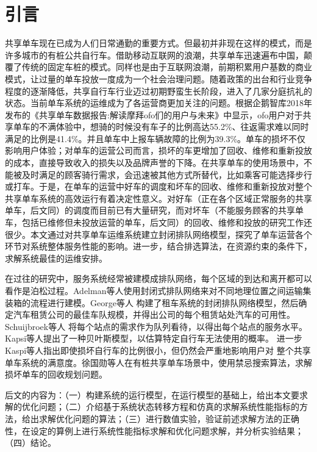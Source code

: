 \documentclass{article}
\begin{document}
\newpage

\section{引言}
共享单车现在已成为人们日常通勤的重要方式。但最初并非现在这样的模式，而是许多城市的有桩公共自行车。借助移动互联网的浪潮，共享单车迅速遍布中国，颠覆了传统的固定车桩的模式。同样也是由于互联网浪潮，前期积累用户基数的商业模式，让过量的单车投放一度成为一个社会治理问题。随着政策的出台和行业竞争程度的逐渐降低，共享自行车行业迈过初期野蛮生长阶段，进入了几家分庭抗礼的状态。当前单车系统的运维成为了各运营商更加关注的问题。根据企鹅智库2018年发布的《共享单车数据报告:解读摩拜ofo们的用户与未来》中显示，ofo用户对于共享单车的不满体验中，想骑的时候没有车子的比例高达55.2\%、往返需求难以同时满足的比例是41.4\%。并且单车中上报车辆故障的比例为39.3\%。单车的损坏不仅影响用户体验；对单车的运营公司而言，损坏的车更增加了回收、维修和重新投放的成本，直接导致收入的损失以及品牌声誉的下降。在共享单车的使用场景中，不能被及时满足的顾客骑行需求，会迅速被其他方式所替代，比如乘客可能选择步行或打车。于是，在单车的运营中好车的调度和坏车的回收、维修和重新投放对整个共享单车系统的高效运行有着决定性意义。对好车（正在各个区域正常服务的共享单车，后文同）的调度而目前已有大量研究，而对坏车（不能服务顾客的共享单车，包括已维修但未投放运营的单车，后文同）的回收、维修和投放的研究工作还很少。本文通过对共享单车运维系统建立封闭排队网络模型，探究了单车运营各个环节对系统整体服务性能的影响。进一步，结合排选算法，在资源约束的条件下，求解系统最佳的运维安排。

在过往的研究中，服务系统经常被建模成排队网络，每个区域的到达和离开都可以看作是泊松过程。Adelman等人\cite{adelman2007price}使用封闭式排队网络来对不同地理位置之间运输集装箱的流程进行建模。George等人\cite{george2011fleet} 构建了租车系统的封闭排队网络模型，然后确定汽车租赁公司的最佳车队规模，并得出公司的每个租赁站处汽车的可用性。 Schuijbroek等人\cite{Schuijbroek2017Inventory} 将每个站点的需求作为队列看待，以得出每个站点的服务水平。Kapsi等人\cite{KaspiDetection}提出了一种贝叶斯模型，以估算特定自行车无法使用的概率。 进一步Kaspi等人\cite{Kaspi2017Bike}指出即使损坏自行车的比例很小，但仍然会严重地影响用户对 整个共享单车系统的满意度。徐国勋等人\cite{徐国勋2019考虑损坏自行车回收的共享单车调度问题}在有桩共享单车场景中，使用禁忌搜索算法，求解损坏单车的回收规划问题。

后文的内容为：（一）构建系统的运行模型，在运行模型的基础上，给出本文要求解的优化问题；（二）介绍基于系统状态转移方程和仿真的求解系统性能指标的方法，给出求解优化问题的算法；（三）进行数值实验，验证前述求解方法的正确性，在设定的算例上进行系统性能指标求解和优化问题求解，并分析实验结果；（四）结论。
\end{document}
